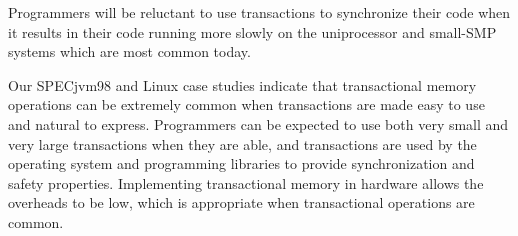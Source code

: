 \documentclass[12pt,oneside]{article}
\newcommand{\note}[1]{}%
\begin{document}
Programmers will be reluctant to use transactions to synchronize their
code when it results in their code running more slowly on the uniprocessor
and small-SMP systems which are most common today.
\note{Segue into hardware transactions writeup?}

Our SPECjvm98 and Linux case studies indicate that
transactional memory operations can be extremely common when
transactions are made easy to use and natural to express.  Programmers
can be expected to use both very small and very large transactions
when they are able, and transactions are used by the operating system
and programming libraries to provide synchronization and safety
properties.  Implementing transactional memory in hardware allows the
overheads to be low\note{\textbf{cite figures here}}, which is appropriate
when transactional operations are common.
\end{document}

